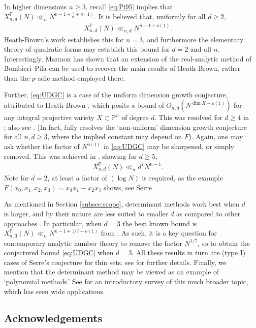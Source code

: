 \documentclass[12pt]{amsart}
\newcommand{\1}{{\mathbf 1}}
\theoremstyle{remark}
\theoremstyle{definition}
\begin{document}
In higher dimensions $n\ge3$, recall \eqref{eq:Pi95} implies that $X_{n,d}^{\mathbb{P}}(N) \ll_n N^{n-1+\frac{1}{d}+o(1)}$. It is believed that, uniformly for all $d\geq 2$,
\begin{align}\label{eq:UDGC}
X_{n,d}^{\mathbb{P}}(N) \ll_{n,d} N^{n-1+o(1)}.
\end{align}
Heath-Brown's work establishes this for $n=3$, and furthermore the elementary theory of quadratic forms may establish this bound for $d=2$ and all $n$. Interestingly, Marmon \cite{Ma10} has shown that an extension of the real-analytic method of Bombieri--Pila can be used to recover the main results of Heath-Brown, rather than the $p$-adic method employed there.

Further, \eqref{eq:UDGC} is a case of the uniform dimension growth conjecture, attributed to Heath-Brown \cite{HB02}, which posits a bound of $O_{n,d}(N^{\dim X+o(1)})$ for any integral projective variety $X\subset \mathbb P^n$ of degree $d$. This was resolved for $d\ge4$ in \cite{Sa23}; also see \cite{BHBS06}. (In fact, \cite{Sa23} fully resolves the `non-uniform' dimension growth conjecture for all $n,d\ge3$, where the implied constant may depend on $F$). Again, one may ask whether the factor of $N^{o(1)}$ in \eqref{eq:UDGC} may be sharpened, or simply removed. 
This was achieved in \cite{CDHNV23}, showing for $d\ge5$,
\begin{align*}
X_{n,d}^{\mathbb{P}}(N) \ll_n d^7 N^{n-1}.
\end{align*}
Note for $d=2$, at least a factor of $(\log N)$ is required, as the example $F(x_0,x_1,x_2,x_3) = x_0x_1 - x_2x_3$ shows, see Serre \cite[p.178]{Se89}.

As mentioned in Section \ref{subsec:scope}, determinant methods work best when $d$ is larger, and by their nature are less suited to smaller $d$ as compared to other approaches \cite{Bir57}. In particular, when $d=3$ the best known bound is $X_{n,3}^{\mathbb{P}}(N) \ll_n N^{n-1+1/7+o(1)}$ from \cite{Sa15}. As such, it is a key question for contemporary analytic number theory to remove the factor $N^{1/7}$, so to obtain the conjectured bound \eqref{eq:UDGC} when $d=3$.
All these results in turn are (type I) cases of Serre's conjecture for thin sets, see \cite{Se89,Se92} for further details. Finally, we mention that the determinant method may be viewed as an example of `polynomial methods.' See \cite{Hau17} for an introductory survey of this much broader topic, which has seen wide applications.


\subsection*{Acknowledgements}
\end{document}
